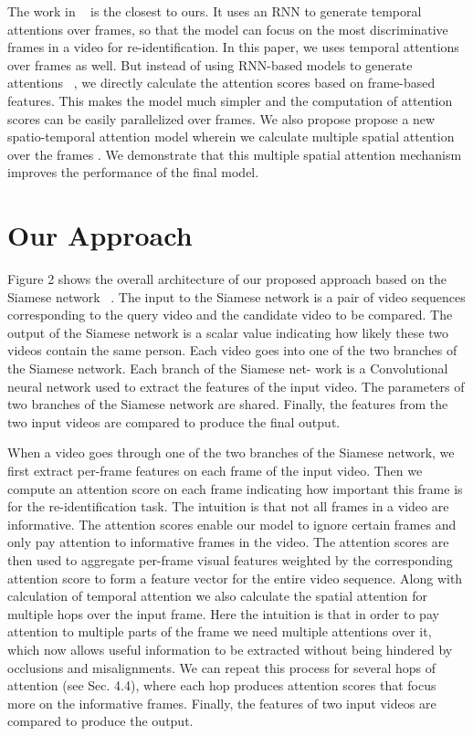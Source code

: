 \documentclass[sigconf, authordraft,review=false]{acmart}
\begin{document}
The work in ~\cite{zhou17_cvpr} is the closest to ours. It uses an RNN to
generate temporal attentions over frames, so that the model
can focus on the most discriminative frames in a video for
re-identification.  In this paper, we uses temporal attentions
over frames as well. But instead of using RNN-based models to generate attentions ~\cite{zhou17_cvpr}, we directly calculate the attention scores based on frame-based features.  This makes
the model much simpler and the computation of attention
scores can be easily parallelized over frames.   We also propose propose a new spatio-temporal attention model wherein we calculate multiple spatial attention over the frames .  We demonstrate that this multiple spatial attention mechanism improves the performance of the final model.

\section{Our Approach}
Figure 2 shows the overall architecture of our proposed
approach based on the Siamese network ~\cite{hadsell06_cvpr}.  The input to
the  Siamese  network  is  a  pair  of  video  sequences  corresponding to the query video and the candidate video to be
compared.  The output of the Siamese network is a scalar
value  indicating  how  likely  these  two  videos  contain  the
same person. Each video goes into one of the two branches
of the Siamese network.  Each branch of the Siamese net-
work is a Convolutional neural network used to extract the
features of the input video. The parameters of two branches
of  the  Siamese  network  are  shared.   Finally,  the  features
from the two input videos are compared to produce the final
output.

When a video goes through one of the two branches of
the Siamese network, we first extract per-frame features on
each  frame  of  the  input  video.   Then  we  compute  an  attention score on each frame indicating how important this
frame is for the re-identification task.  The intuition is that
not  all  frames  in  a  video  are  informative.   The  attention
scores enable our model to ignore certain frames and only
pay attention to informative frames in the video.   The attention scores are then used to aggregate per-frame visual
features weighted by the corresponding attention score to
form a feature vector for the entire video sequence. Along with calculation of temporal attention we also calculate the spatial attention for multiple hops over the input frame. Here the intuition is that in order to pay attention to multiple parts of the frame we need multiple attentions over it, which now allows useful information to be extracted without being hindered by occlusions and misalignments.  We can repeat this process for several hops of attention (see Sec.   4.4),  where each hop
produces attention scores that focus more on the informative frames.  Finally,  the features of two input videos are
compared to produce the output.
\end{document}
